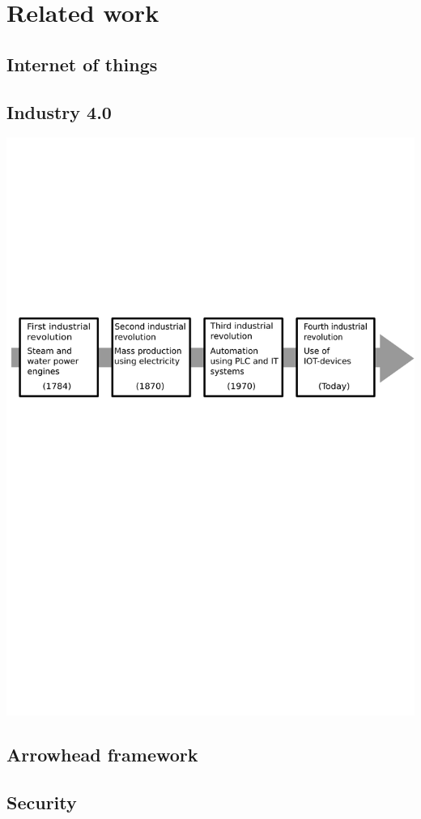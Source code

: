 \section{Related work}
\subsection{Internet of things}
\subsection{Industry 4.0}
\includegraphics[width=\textwidth]{Pictures/Industrial_revolution.pdf}
\subsection{Arrowhead framework}
\subsection{Security}
